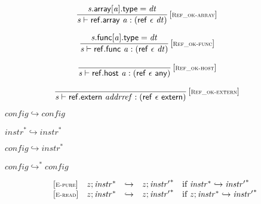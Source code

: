 $$
\begin{array}{@{}c@{}}\displaystyle
\frac{
{\mathit{s}}.\mathsf{array}[{\mathit{a}}].\mathsf{type} = {\mathit{dt}}
}{
{\mathit{s}} \vdash \mathsf{ref.array}~{\mathit{a}} : (\mathsf{ref}~\epsilon~{\mathit{dt}})
} \, {[\textsc{\scriptsize Ref\_ok{-}array}]}
\qquad
\end{array}
$$

$$
\begin{array}{@{}c@{}}\displaystyle
\frac{
{\mathit{s}}.\mathsf{func}[{\mathit{a}}].\mathsf{type} = {\mathit{dt}}
}{
{\mathit{s}} \vdash \mathsf{ref.func}~{\mathit{a}} : (\mathsf{ref}~\epsilon~{\mathit{dt}})
} \, {[\textsc{\scriptsize Ref\_ok{-}func}]}
\qquad
\end{array}
$$

$$
\begin{array}{@{}c@{}}\displaystyle
\frac{
}{
{\mathit{s}} \vdash \mathsf{ref.host}~{\mathit{a}} : (\mathsf{ref}~\epsilon~\mathsf{any})
} \, {[\textsc{\scriptsize Ref\_ok{-}host}]}
\qquad
\end{array}
$$

$$
\begin{array}{@{}c@{}}\displaystyle
\frac{
}{
{\mathit{s}} \vdash \mathsf{ref.extern}~{\mathit{addrref}} : (\mathsf{ref}~\epsilon~\mathsf{extern})
} \, {[\textsc{\scriptsize Ref\_ok{-}extern}]}
\qquad
\end{array}
$$

$\boxed{{\mathit{config}} \hookrightarrow {\mathit{config}}}$

$\boxed{{{\mathit{instr}}^\ast} \hookrightarrow {{\mathit{instr}}^\ast}}$

$\boxed{{\mathit{config}} \hookrightarrow {{\mathit{instr}}^\ast}}$

$\boxed{{\mathit{config}} \hookrightarrow^\ast {\mathit{config}}}$

$$
\begin{array}{@{}l@{}lcl@{}l@{}}
{[\textsc{\scriptsize E{-}pure}]} \quad & {\mathit{z}} ; {{\mathit{instr}}^\ast} &\hookrightarrow& {\mathit{z}} ; {{\mathit{instr}'}^\ast} &\quad
  \mbox{if}~{{\mathit{instr}}^\ast} \hookrightarrow {{\mathit{instr}'}^\ast} \\
{[\textsc{\scriptsize E{-}read}]} \quad & {\mathit{z}} ; {{\mathit{instr}}^\ast} &\hookrightarrow& {\mathit{z}} ; {{\mathit{instr}'}^\ast} &\quad
  \mbox{if}~{\mathit{z}} ; {{\mathit{instr}}^\ast} \hookrightarrow {{\mathit{instr}'}^\ast} \\
\end{array}
$$

